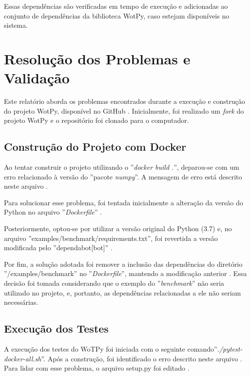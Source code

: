 Essas dependências são verificadas em tempo de execução e adicionadas ao conjunto de dependências da biblioteca WotPy, caso estejam disponíveis no sistema.

\section{Resolução dos Problemas e Validação}

Este relatório aborda os problemas encontrados durante a execução e construção do projeto WotPy, disponível no GitHub \cite{gitwotpy:2022}. Inicialmente, foi realizado um \textit{fork} do projeto WotPy e o repositório  foi clonado para o computador. 

\subsection{Construção do Projeto com Docker}

Ao tentar construir o projeto utilizando o ''\textit{docker build .}'', deparou-se com um erro relacionado à versão do ''pacote \textit{numpy}''. A mensagem de erro está descrito neste arquivo \cite{gitwotpy:cpd}.

Para solucionar esse problema, foi tentada inicialmente a alteração da versão do Python no arquivo ''\textit{Dockerfile}'' \cite{gitwotpy:v1}.

Posteriormente, optou-se por utilizar a versão original do Python (3.7) e, no arquivo ''examples/benchmark/requirements.txt'', foi revertida a versão modificada pelo ''dependabot[bot]'' \cite{gitwotpy:bot, gitwotpy:v2}.

Por fim, a solução adotada foi remover a inclusão das dependências do diretório ''/examples/benchmark'' no ''\textit{Dockerfile}'', mantendo a modificação anterior \cite{gitwotpy:v5}. Essa decisão foi tomada considerando que o exemplo do ''\textit{benchmark}'' não seria utilizado no projeto, e, portanto, as dependências relacionadas a ele não seriam necessárias.

\subsection{Execução dos Testes}

A execução dos testes do WoTPy foi iniciada com o seguinte comando''\textit{./pytest-docker-all.sh}''. Após a construção, foi identificado o erro descrito neste arquivo . Para lidar com esse problema, o arquivo setup.py foi editado \cite{gitwotpy:v1}.

